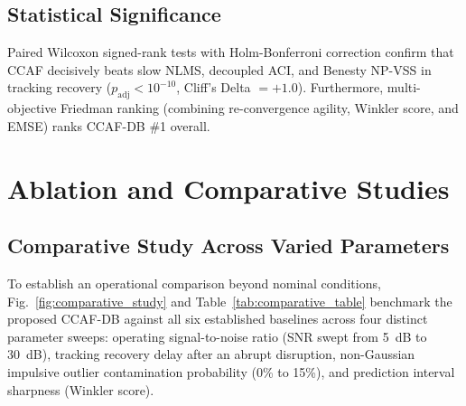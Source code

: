\documentclass[journal,twocolumn]{IEEEtran}
\begin{document}
\begin{table}[t]
\centering
\caption{Monte Carlo Ensemble Performance Across Scenarios}
\label{tab:mc_summary}
\end{table}

\subsection{Statistical Significance}
Paired Wilcoxon signed-rank tests with Holm-Bonferroni correction confirm that CCAF decisively beats slow NLMS, decoupled ACI, and Benesty NP-VSS in tracking recovery ($p_{\text{adj}} < 10^{-10}$, Cliff's Delta $= +1.0$). Furthermore, multi-objective Friedman ranking (combining re-convergence agility, Winkler score, and EMSE) ranks CCAF-DB \#1 overall.

\section{Ablation and Comparative Studies}

\subsection{Comparative Study Across Varied Parameters}
To establish an operational comparison beyond nominal conditions, Fig.~\ref{fig:comparative_study} and Table~\ref{tab:comparative_table} benchmark the proposed CCAF-DB against all six established baselines across four distinct parameter sweeps: operating signal-to-noise ratio (SNR swept from 5~dB to 30~dB), tracking recovery delay after an abrupt disruption, non-Gaussian impulsive outlier contamination probability (0\% to 15\%), and prediction interval sharpness (Winkler score).
\end{document}
